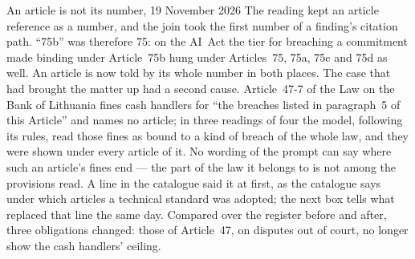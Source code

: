 \begin{lessonbox}{An article is not its number, 19 November 2026}
The reading kept an article reference as a number, and the join took the first number of a
finding's citation path. \enquote{75b} was therefore 75: on the AI~Act the tier for breaching a
commitment made binding under Article~75b hung under Articles~75, 75a, 75c and 75d as well.
An article is now told by its whole number in both places. The case that had brought the
matter up had a second cause. Article~47-7 of the Law on the Bank of Lithuania fines cash
handlers for \enquote{the breaches listed in paragraph~5 of this Article} and names no
article; in three readings of four the model, following its rules, read those fines as bound
to a kind of breach of the whole law, and they were shown under every article of it. No
wording of the prompt can say where such an article's fines end --- the part of the law it
belongs to is not among the provisions read. A line in the catalogue said it at first, as
the catalogue says under which articles a technical standard was adopted; the next box tells
what replaced that line the same day. Compared over the register before and after,
three obligations changed: those of Article~47, on disputes out of court, no longer show the
cash handlers' ceiling.
\end{lessonbox}

